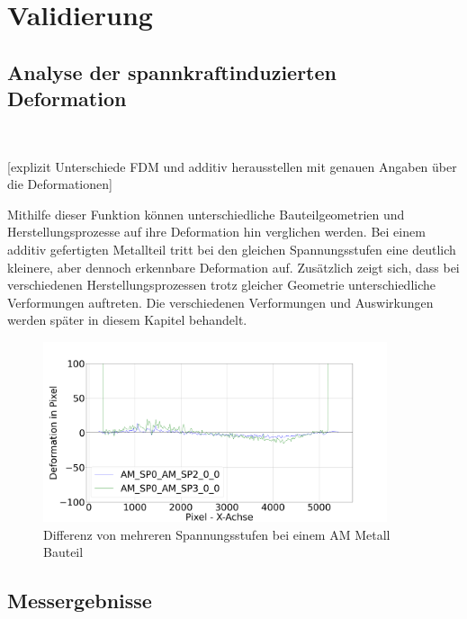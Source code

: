 
\chapter{Validierung}

\section{Analyse der spannkraftinduzierten Deformation}\

[explizit Unterschiede FDM und additiv herausstellen mit genauen Angaben über die Deformationen]

Mithilfe dieser Funktion können unterschiedliche Bauteilgeometrien und
Herstellungsprozesse auf ihre Deformation hin verglichen werden.
Bei einem additiv gefertigten Metallteil tritt bei den 
gleichen Spannungsstufen eine deutlich kleinere, 
aber dennoch erkennbare Deformation auf. Zusätzlich zeigt sich, 
dass bei verschiedenen Herstellungsprozessen trotz gleicher 
Geometrie unterschiedliche Verformungen auftreten.
Die verschiedenen Verformungen und Auswirkungen werden später in diesem
Kapitel behandelt.

\begin{figure}[H]
    \centering
    \includegraphics[width=0.9\textwidth]{images/AM_sp0_sp2_defo_plot.png}
    \caption{Differenz von mehreren Spannungsstufen bei einem AM Metall Bauteil}
    \label{fig:deformation_data_am}
\end{figure}

\section{Messergebnisse}

